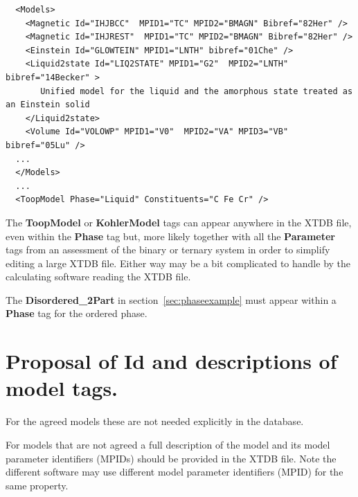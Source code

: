 \documentclass{article}
\begin{document}
\begin{appendices}
{\small
\begin{verbatim}
  <Models>
    <Magnetic Id="IHJBCC"  MPID1="TC" MPID2="BMAGN" Bibref="82Her" />
    <Magnetic Id="IHJREST"  MPID1="TC" MPID2="BMAGN" Bibref="82Her" />
    <Einstein Id="GLOWTEIN" MPID1="LNTH" bibref="01Che" /> 
    <Liquid2state Id="LIQ2STATE" MPID1="G2"  MPID2="LNTH" bibref="14Becker" >
       Unified model for the liquid and the amorphous state treated as an Einstein solid
    </Liquid2state>
    <Volume Id="VOLOWP" MPID1="V0"  MPID2="VA" MPID3="VB" bibref="05Lu" />
  ...
  </Models>
  ...
  <ToopModel Phase="Liquid" Constituents="C Fe Cr" />
\end{verbatim}
}

The {\bf ToopModel} or {\bf KohlerModel} tags can appear anywhere in
the XTDB file, even within the {\bf Phase} tag but, more likely
together with all the {\bf Parameter} tags from an assessment of the
binary or ternary system in order to simplify editing a large XTDB
file.  Either way may be a bit complicated to handle by the
calculating software reading the XTDB file.

The {\bf Disordered\_2Part} in section~\ref{sec:phaseexample} must appear
within a {\bf Phase} tag for the ordered phase.

\newpage 

\setcounter{equation}{0}
\renewcommand{\theequation}{B\arabic{equation}}
\setcounter{figure}{0}
\renewcommand{\thefigure}{B\arabic{figure}}

\section{Proposal of Id and descriptions of model tags.}\label{sec:modelapp}

For the agreed models these are not needed explicitly in the database.

For models that are not agreed a full description of the model and its
model parameter identifiers (MPIDs) should be provided in the XTDB
file.  Note the different software may use different model parameter
identifiers (MPID) for the same property.


\end{appendices}
\end{document}
